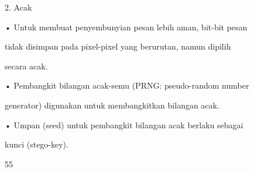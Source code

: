 \documentclass{article}
\begin{document}

2. Acak 

• Untuk membuat penyembunyian pesan lebih aman, bit-bit pesan 

tidak disimpan pada pixel-pixel yang berurutan, namun dipilih 

secara acak. 

• Pembangkit bilangan acak-semu (PRNG: pseudo-random number 

generator) digunakan untuk membangkitkan bilangan acak.

• Umpan (seed) untuk pembangkit bilangan acak berlaku sebagai 

kunci (stego-key).

55
\end{document}
